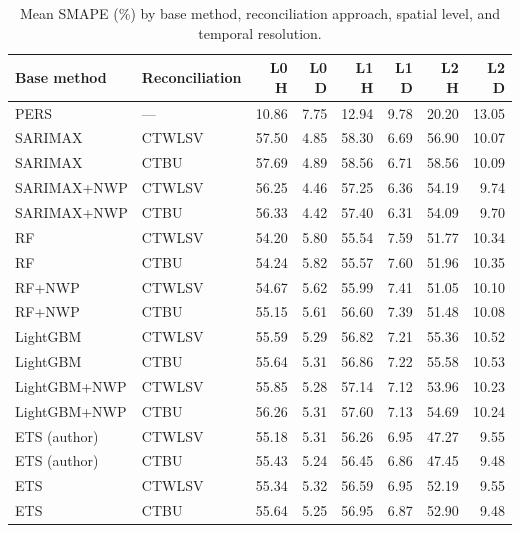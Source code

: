 \begin{table}[htbp]
\centering
\small
\caption{Mean SMAPE (\%) by base method, reconciliation approach, spatial level, and temporal resolution.}
\label{tab:smape}
\begin{tabular}{llrrrrrr}
\toprule
Base method & Reconciliation & L0 H & L0 D & L1 H & L1 D & L2 H & L2 D \\
\midrule
PERS & --- & 10.86 & 7.75 & 12.94 & 9.78 & 20.20 & 13.05 \\
\addlinespace
SARIMAX & CTWLSV & 57.50 & 4.85 & 58.30 & 6.69 & 56.90 & 10.07 \\
SARIMAX & CTBU & 57.69 & 4.89 & 58.56 & 6.71 & 58.56 & 10.09 \\
SARIMAX+NWP & CTWLSV & 56.25 & 4.46 & 57.25 & 6.36 & 54.19 & 9.74 \\
SARIMAX+NWP & CTBU & 56.33 & 4.42 & 57.40 & 6.31 & 54.09 & 9.70 \\
\addlinespace
RF & CTWLSV & 54.20 & 5.80 & 55.54 & 7.59 & 51.77 & 10.34 \\
RF & CTBU & 54.24 & 5.82 & 55.57 & 7.60 & 51.96 & 10.35 \\
RF+NWP & CTWLSV & 54.67 & 5.62 & 55.99 & 7.41 & 51.05 & 10.10 \\
RF+NWP & CTBU & 55.15 & 5.61 & 56.60 & 7.39 & 51.48 & 10.08 \\
\addlinespace
LightGBM & CTWLSV & 55.59 & 5.29 & 56.82 & 7.21 & 55.36 & 10.52 \\
LightGBM & CTBU & 55.64 & 5.31 & 56.86 & 7.22 & 55.58 & 10.53 \\
LightGBM+NWP & CTWLSV & 55.85 & 5.28 & 57.14 & 7.12 & 53.96 & 10.23 \\
LightGBM+NWP & CTBU & 56.26 & 5.31 & 57.60 & 7.13 & 54.69 & 10.24 \\
\addlinespace
ETS (author) & CTWLSV & 55.18 & 5.31 & 56.26 & 6.95 & 47.27 & 9.55 \\
ETS (author) & CTBU & 55.43 & 5.24 & 56.45 & 6.86 & 47.45 & 9.48 \\
ETS & CTWLSV & 55.34 & 5.32 & 56.59 & 6.95 & 52.19 & 9.55 \\
ETS & CTBU & 55.64 & 5.25 & 56.95 & 6.87 & 52.90 & 9.48 \\
\bottomrule
\end{tabular}
\end{table}


